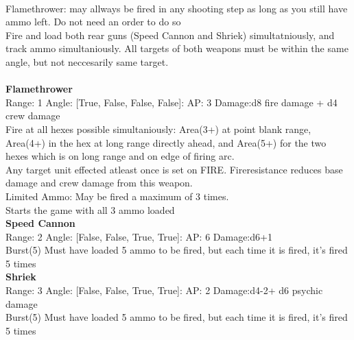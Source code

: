 \ \\
Flamethrower: may allways be fired in any shooting step as long as you still have ammo left. Do not need an order to do so\\ 
Fire and load both rear guns (Speed Cannon and Shriek) simultatniously, and track ammo simultaniously. All targets of both weapons must be within the same angle, but not neccesarily same target.\\ 

\ \\
{\bf Flamethrower } \\



Range: 1  Angle: [True, False, False, False]: AP: 3 Damage:d8 fire damage + d4 crew damage \\
Fire at all hexes possible simultaniously: Area(3+) at point blank range, Area(4+) in the hex at long range directly ahead, and Area(5+) for the two hexes which is on long range and on edge of firing arc. \\ 
 Any target unit effected atleast once is set on FIRE. Fireresistance reduces base damage and crew damage from this weapon. \\ 
 Limited Ammo: May be fired a maximum of 3 times. \\ 
 Starts the game with all 3 ammo loaded\\ 




{\bf Speed Cannon } \\



Range: 2  Angle: [False, False, True, True]: AP: 6 Damage:d6+1 \\
Burst(5) Must have loaded 5 ammo to be fired, but each time it is fired, it's fired 5 times\\ 




{\bf Shriek } \\



Range: 3  Angle: [False, False, True, True]: AP: 2 Damage:d4-2+ d6 psychic damage \\
Burst(5) Must have loaded 5 ammo to be fired, but each time it is fired, it's fired 5 times\\ 




 
\ \\




